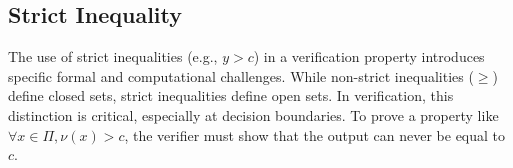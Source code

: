 \subsection*{Strict Inequality}
The use of strict inequalities (e.g., $y > c$) in a verification property introduces specific formal and computational challenges. While non-strict inequalities ($\ge$) define closed sets, 
strict inequalities define open sets. In verification, this distinction is critical, especially at decision boundaries. To prove a property like $\forall x \in \Pi, \nu(x) > c$, the verifier 
must show that the output can never be equal to $c$.

